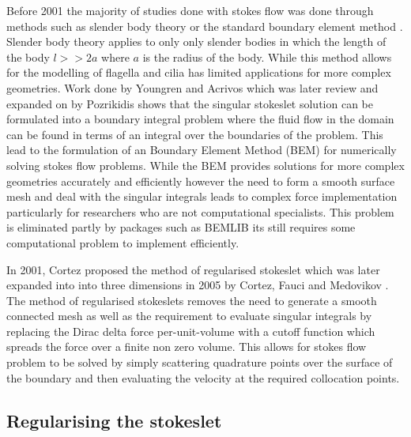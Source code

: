 Before 2001 the majority of studies done with stokes flow was done through methods such as slender body theory \cite{Walker2020AFilaments,Johnson1980AnFlow} or the standard boundary element method \cite{Acrivos1975StokesSolution,Pozrikidis1992BoundaryFlow,Tran-Cong1987APropulsion}. Slender body theory applies to only only slender bodies in which the length of the body $l >> 2a$ where $a$ is the radius of the body. While this method allows for the modelling of flagella and cilia has limited applications for more complex geometries. Work done by Youngren and Acrivos \cite{Acrivos1975StokesSolution} which was later review and expanded on by Pozrikidis \cite{Pozrikidis1992BoundaryFlow} shows that the singular stokeslet solution can be formulated into a boundary integral problem where the fluid flow in the domain can be found in terms of an integral over the boundaries of the problem. This lead to the formulation of an Boundary Element Method (BEM) for numerically solving stokes flow problems. While the BEM provides solutions for more complex geometries accurately and efficiently however the need to form a smooth surface mesh and deal with the singular integrals leads to complex force implementation particularly for researchers who are not computational specialists. This problem is eliminated partly by packages such as BEMLIB \cite{BEMLIB} its still requires some computational problem to implement efficiently.

In 2001, Cortez \cite{Cortez2001} proposed the method of regularised stokeslet which was later expanded into into three dimensions in 2005 by Cortez, Fauci and Medovikov \cite{Cortez2005}. The method of regularised stokeslets removes the need to generate a smooth connected mesh as well as the requirement to evaluate singular integrals by replacing the Dirac delta force per-unit-volume with a cutoff function which spreads the force over a finite non zero volume. This allows for stokes flow problem to be solved by simply scattering quadrature points over the surface of the boundary and then evaluating the velocity at the required collocation points.

\subsection{Regularising the stokeslet}

